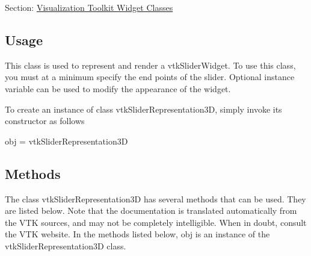 Section\-: \hyperlink{sec_vtkwidgets}{Visualization Toolkit Widget Classes} \hypertarget{vtkwidgets_vtkxyplotwidget_Usage}{}\subsection{Usage}\label{vtkwidgets_vtkxyplotwidget_Usage}
This class is used to represent and render a vtk\-Slider\-Widget. To use this class, you must at a minimum specify the end points of the slider. Optional instance variable can be used to modify the appearance of the widget.

To create an instance of class vtk\-Slider\-Representation3\-D, simply invoke its constructor as follows \begin{DoxyVerb}  obj = vtkSliderRepresentation3D
\end{DoxyVerb}
 \hypertarget{vtkwidgets_vtkxyplotwidget_Methods}{}\subsection{Methods}\label{vtkwidgets_vtkxyplotwidget_Methods}
The class vtk\-Slider\-Representation3\-D has several methods that can be used. They are listed below. Note that the documentation is translated automatically from the V\-T\-K sources, and may not be completely intelligible. When in doubt, consult the V\-T\-K website. In the methods listed below, {\ttfamily obj} is an instance of the vtk\-Slider\-Representation3\-D class. 
